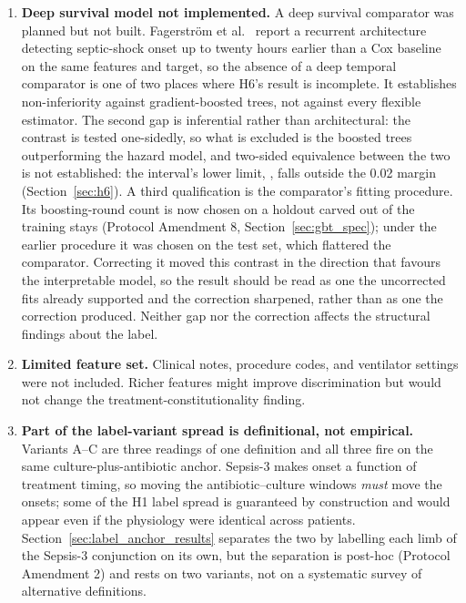 \begin{enumerate}
    \item \textbf{Deep survival model not implemented.} A deep survival
    comparator was planned but not built. Fagerstr{\"o}m et al.\
    \cite{fagerstrom2019lisep} report a recurrent architecture detecting
    septic-shock onset up to twenty hours earlier than a Cox baseline on the
    same features and target, so the absence of a deep temporal comparator is
    one of two places where H6's result is incomplete. It establishes
    non-inferiority against gradient-boosted trees, not against every flexible
    estimator. The second gap is inferential rather than architectural: the
    contrast is tested one-sidedly, so what is excluded is the boosted trees
    outperforming the hazard model, and two-sided equivalence between the two is
    not established: the interval's lower limit, \pcHSixCiLo, falls outside
    the 0.02 margin (Section~\ref{sec:h6}). A third qualification is the
    comparator's fitting procedure. Its boosting-round count is now chosen on a
    holdout carved out of the training stays (Protocol Amendment 8,
    Section~\ref{sec:gbt_spec}); under the earlier procedure it was chosen on
    the test set, which flattered the comparator. Correcting it moved this
    contrast in the direction that favours the interpretable model, so the
    result should be read as one the uncorrected fits already supported and the
    correction sharpened, rather than as one the correction produced. Neither
    gap nor the correction affects the structural findings about the label.

    \item \textbf{Limited feature set.} Clinical notes, procedure codes, and
    ventilator settings were not included. Richer features might improve
    discrimination but would not change the treatment-constitutionality finding.

    \item \textbf{Part of the label-variant spread is definitional, not
    empirical.} Variants A--C are three readings of one definition and all
    three fire on the same culture-plus-antibiotic anchor. Sepsis-3 makes onset
    a function of treatment timing, so moving the antibiotic--culture windows
    \emph{must} move the onsets; some of the H1 label spread is guaranteed by
    construction and would appear even if the physiology were identical across
    patients. Section~\ref{sec:label_anchor_results} separates the two by
    labelling each limb of the Sepsis-3 conjunction on its own, but the
    separation is post-hoc (Protocol Amendment 2) and rests on two variants,
    not on a systematic survey of alternative definitions.


\end{enumerate}
